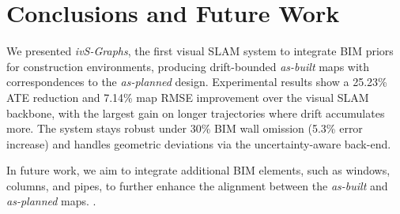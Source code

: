 \section{Conclusions and Future Work}
\label{sec:conclusions}
We presented \textit{ivS-Graphs}, the first visual SLAM system to integrate BIM priors for construction environments, producing drift-bounded \textit{as-built} maps with correspondences to the \textit{as-planned} design. Experimental results show a 25.23\% ATE reduction and 7.14\% map RMSE improvement over the visual SLAM backbone, with the largest gain on longer trajectories where drift accumulates more.
The system stays robust under 30\% BIM wall omission (5.3\% error increase) and handles geometric deviations via the uncertainty-aware back-end.

In future work, we aim to integrate additional BIM elements, such as windows, columns, and pipes, to further enhance the alignment between the \textit{as-built} and \textit{as-planned} maps.  . 